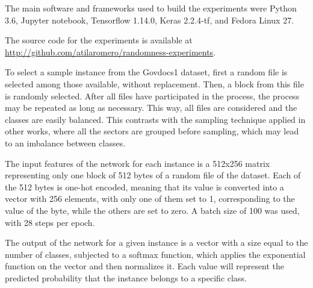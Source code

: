 The main software and frameworks used to build the experiments were Python 3.6, Jupyter notebook, Tensorflow 1.14.0, Keras 2.2.4-tf, and Fedora Linux 27.

The source code for the experiments is available at \sloppy\url{http://github.com/atilaromero/randomness-experiments}.


To select a sample instance from the Govdocs1 dataset, first a random file is selected among those available, without replacement. Then, a block from this file is randomly selected. After all files have participated in the process, the process may be repeated as long as necessary. This way, all files are considered and the classes are easily balanced.
This contrasts with the sampling technique applied in other works, where all the sectors are grouped before sampling, which may lead to an imbalance between classes.

The input features of the network for each instance is a 512x256 matrix representing only one block of 512 bytes of a random file of the dataset. Each of the 512 bytes is one-hot encoded, meaning that its value is converted into a vector with 256 elements, with only one of them set to 1, corresponding to the value of the byte, while the others are set to zero. A batch size of 100 was used, with 28 steps per epoch.


The output of the network for a given instance is a vector with a size equal to the number of classes, subjected to a softmax function, which applies the exponential function on the vector and then normalizes it. Each value will represent the predicted probability that the instance belongs to a specific class.


